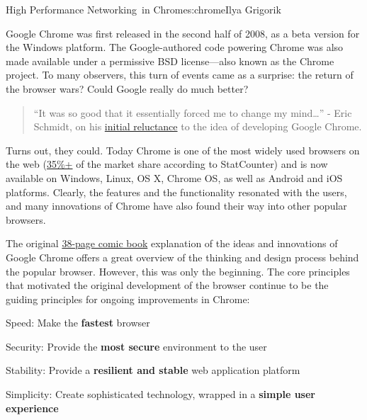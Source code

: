 \begin{aosachapter}{High Performance Networking~in Chrome}{s:chrome}{Ilya Grigorik}


Google Chrome was first released in the second half of 2008, as a beta
version for the Windows platform. The Google-authored code powering
Chrome was also made available under a permissive BSD license---also
known as the Chrome project. To many observers, this turn of events came
as a surprise: the return of the browser wars? Could Google really do
much better?

\begin{quote}
``It was so good that it essentially forced me to change my
mind\ldots{}'' - Eric Schmidt, on his
\href{http://blogs.wsj.com/digits/2009/07/09/sun-valley-schmidt-didnt-want-to-build-chrome-initially-he-says/}{initial
reluctance} to the idea of developing Google Chrome.
\end{quote}

Turns out, they could. Today Chrome is one of the most widely used
browsers on the web
(\href{http://gs.statcounter.com/?PHPSESSID=oc1i9oue7por39rmhqq2eouoh0}{35\%+}
of the market share according to StatCounter) and is now available on
Windows, Linux, OS X, Chrome OS, as well as Android and iOS platforms.
Clearly, the features and the functionality resonated with the users,
and many innovations of Chrome have also found their way into other
popular browsers.

The original \href{http://www.google.com/googlebooks/chrome/}{38-page
comic book} explanation of the ideas and innovations of Google Chrome
offers a great overview of the thinking and design process behind the
popular browser. However, this was only the beginning. The core
principles that motivated the original development of the browser
continue to be the guiding principles for ongoing improvements in
Chrome:

\begin{aosadescription}

\item[Speed:]
Make the \textbf{fastest} browser
\item[Security:]
Provide the \textbf{most secure} environment to the user
\item[Stability:]
Provide a \textbf{resilient and stable} web application platform
\item[Simplicity:]
Create sophisticated technology, wrapped in a \textbf{simple user experience}
\end{aosadescription}


\end{aosachapter}
